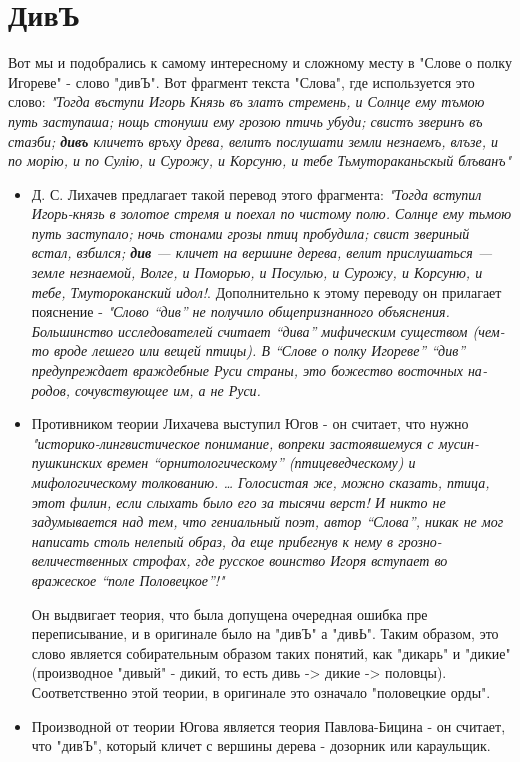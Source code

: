 \documentclass[14pt, a4paper]{article}
\begin{document}
\section{ДивЪ}
Вот мы и подобрались к самому интересному и сложному месту в "Слове о полку Игореве" - слово "дивЪ". Вот фрагмент текста "Слова", где используется это слово: {\itshape "Тогда въступи Игорь Князь въ златъ стремень, и Солнце ему тъмою путь заступаша; нощь стонуши ему грозою птичь убуди; свистъ зверинъ въ стазби; {\bfseries дивъ} кличетъ връху древа, велитъ послушати земли незнаемъ, влъзе, и по морію, и по Сулію, и Сурожу, и Корсуню, и тебе Тьмутораканьскый блъванъ"}
\begin{itemize}
  \item Д. С. Лихачев предлагает такой перевод этого фрагмента: {\itshape "Тогда вступил Игорь-князь в золотое стре­мя и поехал по чистому полю. Солнце ему тьмою путь засту­пало; ночь стонами грозы птиц пробудила; свист звериный встал, взбился; {\bfseries див} — кличет на вершине дерева, велит прислушаться — земле незнаемой, Волге, и Поморью, и Посулью, и Сурожу, и Корсуню, и тебе, Тмутороканский идол!}. Дополнительно к этому переводу он прилагает пояснение - {\itshape "Слово “див” не получило обще­признанного объяснения. Большинство исследователей счита­ет “дива” мифическим существом (чем-то вроде лешего или вещей птицы). В “Слове о полку Игореве” “див” предупреждает враждебные Руси страны, это божество восточных на­родов, сочувствующее им, а не Руси.}
  \item Противником теории Лихачева выступил Югов - он считает, что нужно {\itshape "историко-лингвистическое понимание, вопреки застоявшемуся с мусин-пушкинских времен “орнитологическому” (птицеведческому) и мифологическому толкованию. … Голосистая же, можно сказать, птица, этот филин, если слыхать было его за тысячи верст! И никто не задумывается над тем, что гениальный поэт, автор “Слова”, никак не мог написать столь нелепый образ, да еще прибегнув к нему в грозно-величественных строфах, где русское воинство Игоря вступает во вражеское “поле Поло­вецкое”!"}
  \par Он выдвигает теория, что была допущена очередная ошибка пре переписывание, и в оригинале было на "дивЪ" а "дивЬ". Таким образом, это слово является собирательным образом таких понятий, как "дикарь" и "дикие" (производное "дивый" - дикий, то есть дивь -> дикие -> половцы). Соответственно этой теории, в оригинале это означало "половецкие орды".
  \item Производной от теории Югова является теория Павлова-Бицина - он считает, что "дивЪ", который кличет с вершины дерева - дозорник или караульщик.

\end{itemize}
\end{document}

